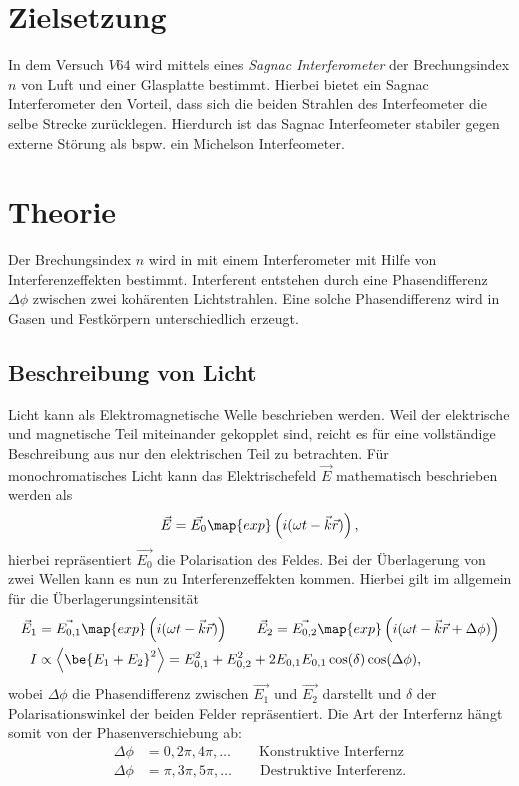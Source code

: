 \setcounter{page}{1}
\section*{Zielsetzung}
In dem Versuch $V64$ wird mittels eines \emph{Sagnac Interferometer}
der Brechungsindex $n$ von Luft und einer Glasplatte bestimmt.
Hierbei bietet ein Sagnac Interferometer den Vorteil, dass sich
die beiden Strahlen des Interfeometer die selbe Strecke zurücklegen.
Hierdurch ist das Sagnac Interfeometer stabiler gegen externe Störung
als bspw. ein Michelson Interfeometer.

\section{Theorie}
Der Brechungsindex $n$ wird in mit einem Interferometer mit Hilfe von
Interferenzeffekten bestimmt. Interferent entstehen durch
eine Phasendifferenz $\Delta\phi$ zwischen zwei kohärenten Lichtstrahlen.
Eine solche Phasendifferenz wird in Gasen und Festkörpern unterschiedlich erzeugt.

\subsection{Beschreibung von Licht}

Licht kann als Elektromagnetische Welle beschrieben werden.
Weil der elektrische und magnetische Teil miteinander gekopplet sind, reicht
es für eine vollständige Beschreibung aus nur den elektrischen Teil zu betrachten.
Für monochromatisches Licht kann das Elektrischefeld $\vec{E}$ mathematisch beschrieben
werden als
\begin{equation*}
  \vec{E} = \vec{E_0} \map{exp}\left(i (\omega t-\vec{k}\vec{r})\right),
\end{equation*}
hierbei repräsentiert $\vec{E_0}$ die Polarisation des Feldes.
Bei der Überlagerung von zwei Wellen kann es nun zu Interferenzeffekten kommen.
Hierbei gilt im allgemein für die Überlagerungsintensität
\begin{align}
  \label{eq:Interferenz_enstehung}
  \begin{aligned}
  \vec{E}_1&=\vec{E_{0,1}} \map{exp}\left(i (\omega t-\vec{k}\vec{r})\right) \qquad \vec{E}_2 =\vec{E_{0,2}} \map{exp}\left(i (\omega t-\vec{k}\vec{r}+\Delta\phi)\right) \\
  I &\propto \left<\be{E_1+E_2}^2\right> = E_{0,1}^2 + E_{0,2}^2 + 2E_{0,1}E_{0,1}\cos(\delta)\cos(\Delta\phi),
\end{aligned}
\end{align}
wobei $\Delta\phi$ die Phasendifferenz zwischen $\vec{E_1}$ und $\vec{E_2}$ darstellt und
$\delta$ der Polarisationswinkel der beiden Felder repräsentiert.
Die Art der Interfernz hängt somit von der Phasenverschiebung ab:
\begin{align}
  \Delta\phi &=0,2\pi,4\pi,\dots \qquad \text{Konstruktive Interfernz} \label{eq:Konstruktive}\\
  \Delta\phi &= \pi, 3\pi, 5\pi,\dots \qquad \text{Destruktive Interferenz}. \label{eq:Destruktive}
\end{align}
